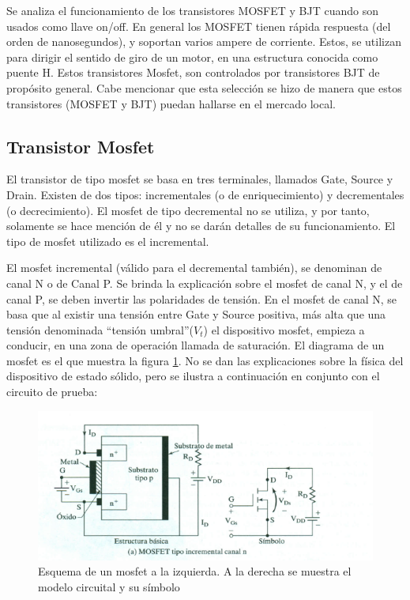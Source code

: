 Se analiza el funcionamiento de los transistores MOSFET y BJT cuando son usados como llave on/off. En general los MOSFET tienen rápida respuesta (del orden de nanosegundos), y soportan varios ampere de corriente. Estos, se utilizan para dirigir el sentido de giro de un motor, en una estructura conocida como puente H. Estos transistores Mosfet, son controlados por transistores BJT de propósito general. Cabe mencionar que esta selección se hizo de manera que estos transistores (MOSFET y BJT) puedan hallarse en el mercado local.   
%
\subsection{Transistor Mosfet} 

El transistor de tipo mosfet se basa en tres terminales, llamados Gate, Source y Drain. Existen de dos tipos: incrementales (o de enriquecimiento) y decrementales (o decrecimiento). El mosfet de tipo decremental no se utiliza, y por tanto, solamente se hace mención de él y no se darán detalles de su funcionamiento. El tipo de mosfet utilizado es el incremental. 


El mosfet incremental (válido para el decremental también), se denominan de canal N o de Canal P. Se brinda la explicación sobre el mosfet de canal N, y el de canal P, se deben invertir las polaridades de tensión. En el mosfet de canal N, se basa que al existir una tensión entre Gate y Source positiva, más alta que una tensión denominada ``tensión umbral''($V_{t}$) el dispositivo mosfet, empieza a conducir, en una zona de operación llamada de saturación. El diagrama de un mosfet es el que muestra la figura \ref{fig:mosfet_str_model}. No se dan las explicaciones sobre la física del dispositivo de estado sólido, pero se ilustra a continuación en conjunto con el circuito de prueba: 

\begin{figure}[ht!]
	\includegraphics{mosfet_estr}
	\caption{Esquema de un mosfet a la izquierda. A la derecha se muestra el modelo circuital y su símbolo}
	\label{fig:mosfet_str_model}
\end{figure}

